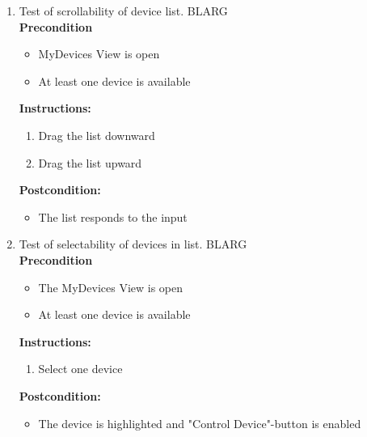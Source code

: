 \documentclass[a4paper]{article}
\newlength{\testlabellength}
\newenvironment{testlist}{\begin{enumerate}[label=\bfseries Instruction \thesubsection.\arabic* , labelindent=0pt, labelwidth=\testlabellength , leftmargin=2cm]}{\end{enumerate}}
\newenvironment{precondition}{
{\color{white}BLARG}\\ 
\textbf{Precondition}
\begin{itemize}[labelindent=0cm, labelwidth=2cm , leftmargin=1cm]
}
{\end{itemize}}
\newenvironment{instruction}{
\textbf{Instructions:}
\begin{enumerate}[label=\bfseries  \arabic*., labelindent=0cm, labelwidth=2cm , leftmargin=1cm]
}
{\end{enumerate}}
\newenvironment{postcondition}{
\textbf{Postcondition:}
\begin{itemize}[labelindent=0cm, labelwidth=2cm , leftmargin=1cm]
}
{\end{itemize}}
\begin{document}
\begin{appendices}
\begin{testlist}
    \item Test of scrollability of device list.
    	\begin{precondition}
    		\item MyDevices View is open
    		\item At least one device is available
    	\end{precondition}
    	\begin{instruction}
			\item Drag the list downward
			\item Drag the list upward
		\end{instruction}
		\begin{postcondition}
			\item The list responds to the input
		\end{postcondition}
   \newpage
    \item Test of selectability of devices in list.
     	\begin{precondition}
    		\item The MyDevices View is open
    		\item At least one device is available
    	\end{precondition}
		\begin{instruction}
			\item Select one device
		\end{instruction}
		\begin{postcondition}
			\item The device is highlighted and "Control Device"-button is enabled
		\end{postcondition}
   

\end{testlist}
\end{appendices}
\end{document}
